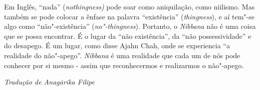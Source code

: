 Em Inglês, ``nada'' (\emph{nothingness)} pode soar como aniquilação,
como niilismo. Mas também se pode colocar a ênfase na palavra
``existência'' (\emph{thingness}), e aí tem"-se algo como
``não"-existência'' (\emph{no"-thingness}). Portanto, o \emph{Nibbana} não
é uma coisa que se possa encontrar. É o lugar da ``não existência'', da
``não possessividade'' e do desapego. É um lugar, como disse Ajahn Chah,
onde se experiencia ``a realidade do não"-apego''. \emph{Nibbana} é uma
realidade que cada um de nós pode conhecer por si mesmo - assim que
reconhecermos e realizarmos o não"-apego.


\bigskip

{\raggedleft\itshape
  Tradução de Anagārika Filipe
\par}
